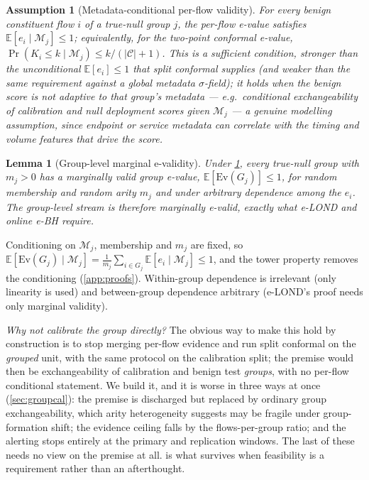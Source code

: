 \documentclass[conference]{IEEEtran}
\newtheorem{lemma}[theorem]{Lemma}
\newtheorem{assumption}{Assumption}
\newcommand{\Cal}{\mathcal{C}}
\newcommand{\nCal}{\lvert\Cal\rvert}
\newcommand{\Ev}{\mathrm{Ev}}
\begin{document}
\begin{assumption}[Metadata-conditional per-flow validity]\label{assump:groupval}
For every benign constituent flow $i$ of a true-null group $j$, the per-flow e-value satisfies
$\mathbb{E}[e_i \mid \mathcal{M}_j]\le1$; equivalently, for the two-point conformal e-value,
$\Pr(K_i\le k \mid \mathcal{M}_j)\le k/(\nCal+1)$. This is a \emph{sufficient} condition, stronger than
the unconditional $\mathbb{E}[e_i]\le1$ that split conformal supplies (and weaker than the same
requirement against a global metadata $\sigma$-field); it holds when the benign score
is not adaptive to that group's metadata --- e.g.\ conditional exchangeability of calibration and
null deployment scores given $\mathcal{M}_j$ --- a genuine modelling assumption, since endpoint or
service metadata can correlate with the timing and volume features that drive the score.
\end{assumption}

\begin{lemma}[Group-level marginal e-validity]\label{lem:groupval}
Under \cref{assump:groupval}, every true-null group with $m_j>0$ has a marginally valid group
e-value, $\mathbb{E}[\Ev(G_j)]\le1$, for random membership and random arity $m_j$ and under arbitrary
dependence among the $e_i$. The group-level stream is therefore marginally e-valid, exactly what
e-LOND and online e-BH require.
\end{lemma}

Conditioning on $\mathcal{M}_j$, membership and $m_j$ are fixed, so
$\mathbb{E}[\Ev(G_j)\mid\mathcal{M}_j]=\frac1{m_j}\sum_{i\in G_j}\mathbb{E}[e_i\mid\mathcal{M}_j]\le1$,
and the tower property removes the conditioning (\cref{app:proofs}). Within-group dependence is
irrelevant (only linearity is used) and between-group dependence arbitrary (e-LOND's proof needs only
marginal validity).

\emph{Why not calibrate the group directly?} The obvious way to make this hold by construction is
to stop merging per-flow evidence and run split conformal on the \emph{grouped} unit, with the same
protocol on the calibration split; the premise would then be exchangeability of calibration and
benign test \emph{groups}, with no per-flow conditional statement. We build it, and it is worse in
three ways at once (\cref{sec:groupcal}): the premise is discharged but replaced by ordinary group
exchangeability, which arity heterogeneity suggests may be fragile under group-formation shift; the
evidence ceiling falls by the flows-per-group ratio; and the alerting stops entirely
at the primary and replication windows. The last of these needs no view on the premise at all.  is what
survives when feasibility is a requirement rather than an afterthought.
\end{document}
